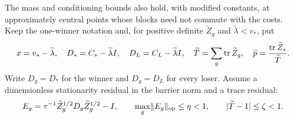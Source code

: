 The mass and conditioning bounds also hold, with modified constants, at
approximately central points whose blocks need not commute with the costs.
Keep the one-winner notation and, for positive definite $\widetilde Z_g$
and $\widetilde\lambda<v_*$, put
\begin{equation}
 x=v_*-\widetilde\lambda,\quad
 D_*=C_*-\widetilde\lambda I,\quad D_L=C_L-\widetilde\lambda I,\quad
 \widetilde T=\sum_g\operatorname{tr}\widetilde Z_g,\quad
 \widetilde p=\frac{\operatorname{tr}\widetilde Z_*}{\widetilde T}.       \label{eq:cond-robust-defs}
\end{equation}
Write $D_g=D_*$ for the winner and $D_g=D_L$ for every loser.
Assume a dimensionless stationarity residual in the barrier norm and a
trace residual:
\begin{equation}
 E_g=\tau^{-1}\widetilde Z_g^{1/2}D_g\widetilde Z_g^{1/2}-I,\qquad
 \max_g\lVert E_g\rVert_{\rm op}\le\eta<1,\qquad
 |\widetilde T-1|\le\zeta<1.                              \label{eq:cond-robust-residual}
\end{equation}

